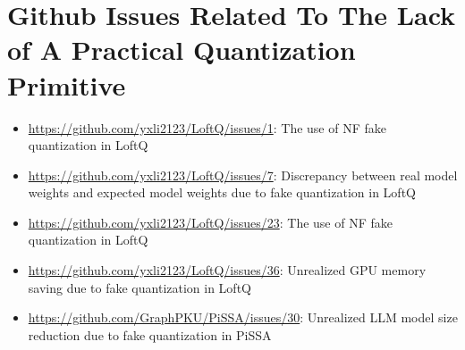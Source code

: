 \section{Github Issues Related To The Lack of A Practical Quantization Primitive}\label{app:githubissues}

\begin{itemize}
    \item \url{https://github.com/yxli2123/LoftQ/issues/1}: The use of NF fake quantization in LoftQ
    \item \url{https://github.com/yxli2123/LoftQ/issues/7}: Discrepancy between real model weights and expected model weights due to fake quantization in LoftQ
    \item \url{https://github.com/yxli2123/LoftQ/issues/23}: The use of NF fake quantization in LoftQ
    \item \url{https://github.com/yxli2123/LoftQ/issues/36}: Unrealized GPU memory saving due to fake quantization in LoftQ
    \item \url{https://github.com/GraphPKU/PiSSA/issues/30}: Unrealized LLM model size reduction due to fake quantization in PiSSA
\end{itemize}